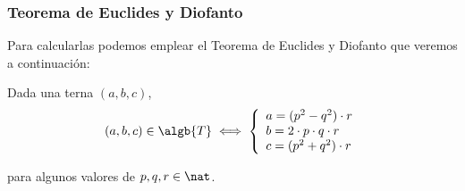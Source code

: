 \documentclass{apuntes}
\begin{document}
\subsubsection{Teorema de Euclides y Diofanto}
Para calcularlas podemos emplear el Teorema de Euclides y Diofanto que veremos a continuación:
\begin{theorem}
Dada una terna $(a,b,c)$,
\[(a,b,c) \in \algb{T} \iff \left\{ \begin{array}{l} a = (p^2-q^2)\cdot r \\ b = 2\cdot p\cdot q\cdot r \\ c = (p^2+q^2)\cdot r\end{array}\right.\]

para algunos valores de $p,q,r \in \nat$.
\end{theorem}
\end{document}
